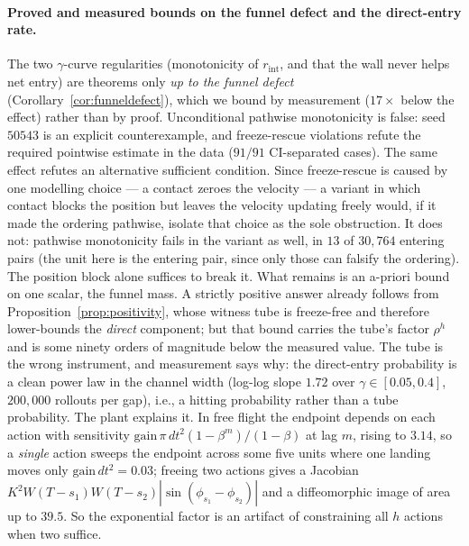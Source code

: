 \documentclass[11pt]{article}
\theoremstyle{remark}
\begin{document}
\paragraph{Proved and measured bounds on the funnel defect and the
direct-entry rate.} The two $\gamma$-curve regularities
(monotonicity of $r_{\mathrm{int}}$, and that the wall never helps net
entry) are theorems only \emph{up to the funnel defect}
(Corollary~\ref{cor:funneldefect}), which we bound by measurement
($17\times$ below the effect) rather than by proof. Unconditional
pathwise monotonicity is false: seed $50543$ is an explicit
counterexample, and freeze-rescue violations refute the required
pointwise estimate in the data ($91/91$ CI-separated cases). The same
effect refutes an alternative sufficient condition. Since freeze-rescue is caused by one modelling choice --- a contact
zeroes the velocity --- a variant in which contact blocks the position
but leaves the velocity updating freely would, if it made the ordering
pathwise, isolate that choice as the sole obstruction. It does not:
pathwise monotonicity fails in the variant as well, in $13$ of $30{,}764$
entering pairs (the unit here is the entering pair, since only those can
falsify the ordering). The position block alone suffices to break it. What
remains is an a-priori bound on one scalar, the funnel mass. A strictly
positive answer already follows from
Proposition~\ref{prop:positivity}, whose witness tube is freeze-free and
therefore lower-bounds the \emph{direct} component; but that bound
carries the tube's factor $\rho^{h}$ and is some ninety orders of
magnitude below the measured value. The tube is the wrong instrument, and
measurement says why: the direct-entry probability is a clean power law in
the channel width (log-log slope $1.72$ over $\gamma \in [0.05, 0.4]$,
$200{,}000$ rollouts per gap), i.e., a hitting probability rather than a
tube probability. The plant explains it. In free flight the endpoint
depends on each action with sensitivity
$\mathrm{gain}\,\pi\,dt^{2}(1-\beta^{m})/(1-\beta)$ at lag $m$, rising
to $3.14$, so a \emph{single} action sweeps the endpoint across some five
units where one landing moves only $\mathrm{gain}\,dt^{2} = 0.03$; freeing
two actions gives a Jacobian
$K^{2}W(T-s_1)W(T-s_2)|\sin(\phi_{s_1}-\phi_{s_2})|$ and a
diffeomorphic image of area up to $39.5$. So the exponential factor is an
artifact of constraining all $h$ actions when two suffice.
\end{document}

